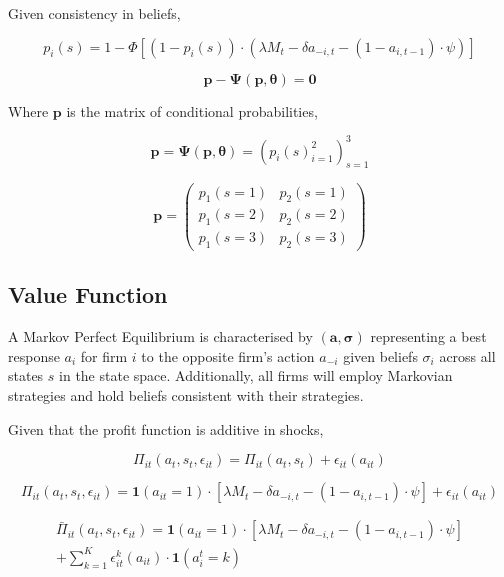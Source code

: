 \documentclass{article}
\begin{document}
\noindent Given consistency in beliefs,

\begin{equation}
p_i(s)=1-\Phi[ ( 1-p_i(s) ) \cdot (\lambda M_t - \delta a_{-i,t}-(1-a_{i,t-1}) \cdot \psi)]
\end{equation}

\begin{equation}
\mathbf{p-\Psi(p,\theta)=0}
\end{equation}

\noindent Where $\mathbf{p}$ is the matrix of conditional probabilities,

\begin{equation}
\mathbf{p=\Psi(p,\theta)=} (p_i(s)^2 _{i=1})^3 _{s=1}
\end{equation}

\begin{equation}
\mathbf{p}=
\begin{pmatrix}
p_1(s=1) & p_2(s=1) \\
p_1(s=2) & p_2(s=2) \\
p_1(s=3) & p_2(s=3)
\end{pmatrix}
\end{equation}

\newpage

\subsection{Value Function}

A Markov Perfect Equilibrium is characterised by $\mathbf{(a, \sigma)}$ representing a best response $a_i$ for firm $i$ to the opposite firm's action $a_{-i}$ given beliefs $\sigma_i$ across all states $s$ in the state space. Additionally, all firms will employ Markovian strategies and hold beliefs consistent with their strategies.

Given that the profit function is additive in shocks,

\begin{equation}
\Pi_{it}(a_t, s_t, \epsilon_{it}) = \Pi_{it}(a_t, s_t) + \epsilon_{it}(a_{it})
\end{equation}

\begin{equation}
\Pi_{it}(a_t, s_t, \epsilon_{it}) = \mathbf{1} (a_{it}=1) \cdot [ \lambda M_t - \delta a_{-i,t} - (1-a_{i,t-1}) \cdot \psi ] + \epsilon_{it}(a_{it})
\end{equation}

\begin{equation}
\begin{split}
\bar{\Pi}_{it}(a_t, s_t, \epsilon_{it}) = \mathbf{1} (a_{it}=1) \cdot [ \lambda M_t - \delta a_{-i,t} - (1-a_{i,t-1}) \cdot \psi ] \\ + \sum_{k=1} ^K \epsilon_{it}^k (a_{it}) \cdot \mathbf{1}(a_{i}^t=k)
\end{split}
\end{equation}
\end{document}
